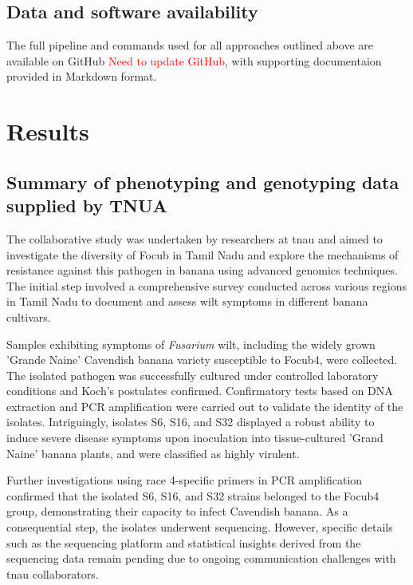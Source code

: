 \subsection{Data and software availability}

The full pipeline and commands used for all approaches outlined above are available on GitHub \textcolor{red}{Need to update GitHub}, with supporting documentaion provided in Markdown format.

\newpage

\section{Results}
\subsection{Summary of phenotyping and genotyping data supplied by TNUA}

The collaborative study was undertaken by researchers at \acs{tnau} and aimed to investigate the diversity of \ac{Focub} in Tamil Nadu and explore the mechanisms of resistance against this pathogen in banana using advanced genomics techniques. The initial step involved a comprehensive survey conducted across various regions in Tamil Nadu to document and assess wilt symptoms in different banana cultivars.

Samples exhibiting symptoms of \textit{Fusarium} wilt, including the widely grown 'Grande Naine' Cavendish banana variety susceptible to \acs{Focub4}, were collected. The isolated pathogen was successfully cultured under controlled laboratory conditions and Koch's postulates confirmed. Confirmatory tests based on DNA extraction and PCR amplification were carried out to validate the identity of the isolates. Intriguingly,  isolates S6, S16, and S32 displayed a robust ability to induce severe disease symptoms upon inoculation into tissue-cultured 'Grand Naine' banana plants, and were classified as highly virulent.

Further investigations using race 4-specific primers in PCR amplification confirmed that the isolated S6, S16, and S32 strains belonged to the \acs{Focub4} group, demonstrating their capacity to infect Cavendish banana. As a consequential step, the isolates underwent sequencing. However, specific details such as the sequencing platform and statistical insights derived from the sequencing data remain pending due to ongoing communication challenges with \ac{tnau} collaborators.

